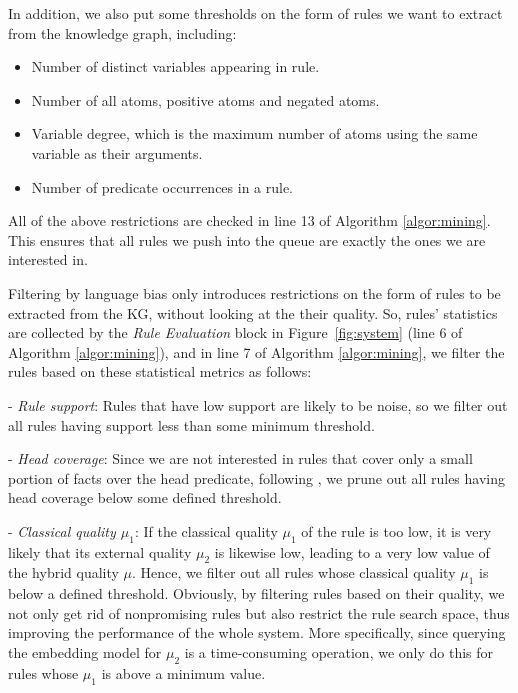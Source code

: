In addition, we also put some thresholds on the form of rules we want to extract from the knowledge graph, including:
\begin{itemize}
  \item Number of distinct variables appearing in rule. 
  \item Number of all atoms, positive atoms and negated atoms.
  \item Variable degree, which is the maximum number of atoms using the same variable as their arguments.
  \item Number of predicate occurrences in a rule.
\end{itemize}
All of the above restrictions are checked in line 13 of Algorithm \ref{algor:mining}. This ensures that all rules we push into the queue are exactly the ones we are interested in.


Filtering by language bias only introduces restrictions on the form of rules to be extracted from the KG, without looking at the their quality. So, rules' statistics are collected by the \emph{Rule Evaluation} block in Figure~\ref{fig:system} (line 6 of Algorithm \ref{algor:mining}), and in line 7 of Algorithm \ref{algor:mining}, we filter the rules based on these statistical metrics as follows:

\noindent- \textit{Rule support}: Rules that have low support are likely to be noise, so we filter out all rules having support less than some minimum threshold.

\noindent- \textit{Head coverage}: Since we are not interested in rules that cover only a small portion of facts over the head predicate, following \cite{amie}, we prune out all rules having head coverage below some defined threshold.

\noindent- \textit{Classical quality $\mu_1$}: If the classical quality $\mu_1$ of the rule is too low, it is very likely that its external quality $\mu_2$ is likewise low, leading to a very low value of the hybrid quality $\mu$. Hence, we filter out all rules whose classical quality $\mu_1$ is below a defined threshold. Obviously, by filtering rules based on their quality, we not only get rid of nonpromising rules but also restrict the rule search space, thus improving the performance of the whole system. More specifically, since querying the embedding model for $\mu_2$ is a time-consuming operation, we only do this for rules whose $\mu_1$ is above a minimum value.

